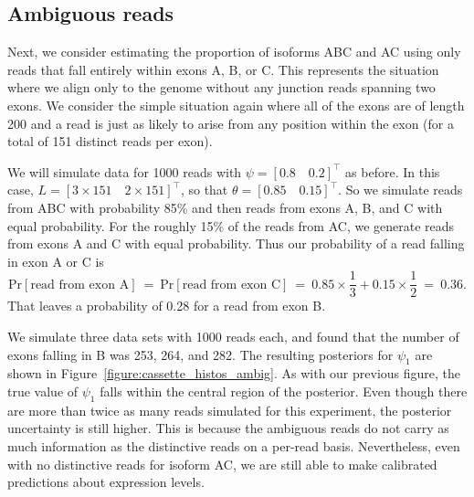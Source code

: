 \documentclass[11pt]{report}
\newcommand{\vect}[1]{[#1]^{\top}}
\begin{document}
\subsection{Ambiguous reads}

Next, we consider estimating the proportion of isoforms ABC and AC
using only reads that fall entirely within exons A, B, or C.  This
represents the situation where we align only to the genome without any
junction reads spanning two exons.  We consider the simple situation
again where all of the exons are of length 200 and a read is just as
likely to arise from any position within the exon (for a total of 151
distinct reads per exon).

We will simulate data for 1000 reads with $\psi = \vect{0.8 \quad 0.2}$ as before.
In this case, $L = \vect{3 \times 151 \quad 2 \times 151}$, so that
$\theta = \vect{0.85 \quad 0.15}$.  So we simulate reads from ABC with
probability 85\% and then reads from exons A, B, and C with equal
probability.  For the roughly 15\% of the reads from AC, we generate
reads from exons A and C with equal probability.  Thus our probability
of a read falling in exon A or C is
\[
  \textrm{Pr}[\textrm{read from exon A}]
  \ = \ \textrm{Pr}[\textrm{read from exon C}]
  \ = \ 0.85 \times \frac{1}{3} + 0.15 \times \frac{1}{2}
  \ = \ 0.36.
\]
That leaves a probability of 0.28 for a read from exon B.

We simulate three data sets with 1000 reads each, and found that the
number of exons falling in B was 253, 264, and 282.  The resulting
posteriors for $\psi_1$ are shown in
Figure~\ref{figure:cassette_histos_ambig}.  As with our previous figure,
the true value of $\psi_1$ falls within the central region of the
posterior.  Even though there are more than twice as many reads
simulated for this experiment, the posterior uncertainty is still
higher.  This is because the ambiguous reads do not carry as much
information as the distinctive reads on a per-read basis.
Nevertheless, even with no distinctive reads for isoform AC, we are
still able to make calibrated predictions about expression levels.



  


\nocite{aitchison1982statistical}
\nocite{gelman2012we}

\clearpage
{}
{}

\end{document}
